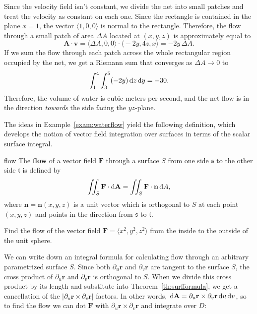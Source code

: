\documentclass[prettycode,shellescape]{watsonbook}
\begin{document}
\begin{solution}
  Since the velocity field isn't constant, we divide the net into
  small patches and treat the velocity as constant on each one. Since
  the rectangle is contained in the plane $x=1$, the vector
  $\langle 1, 0, 0 \rangle$ is normal to the rectangle. Therefore, the flow
  through a small patch of area $\Delta A$ located at $(x,y,z)$ is
  approximately equal to
  \[
    \mathbf{A} \cdot \mathbf{v} = \big\langle \Delta A, 0, 0 \big\rangle \cdot
    \big\langle -2y, 4z, x \big\rangle = -2y \, \Delta A. 
  \]
  If we sum the flow through each patch across the whole rectangular
  region occupied by the net, we get a Riemann sum that converges as
  $\Delta A \to 0$ to
  \[
    \int_1^4 \int_3^5 (-2y) \, \mathrm{d} z \, \mathrm{d} y = -30. 
  \]
  Therefore, the volume of water is  cubic meters per
  second, and the net flow is in the direction \textit{towards} the
  side facing the $yz$-plane.
\end{solution}

The ideas in Example~\ref{exam:waterflow} yield the following
definition, which develops the notion of vector field integration over
surfaces in terms of the scalar surface
integral. 

\begin{defn}{}{flow}
  The \textbf{flow} of a vector field $\mathbf{F}$ through a surface
  $S$ from one side $\mathfrak{s}$ to the other side $\mathfrak{t}$ is defined by
  \[
    \iint_S \mathbf{F} \cdot \mathrm{d}\mathbf{A} =  \iint_S \mathbf{F} \cdot \mathbf{n}
    \, {\mathrm{d}}A, 
  \]
  where $\mathbf{n}=\mathbf{n}(x,y,z)$ is a unit vector which is
  orthogonal to $S$ at each point $(x,y,z)$ and points in the
  direction from $\mathfrak{s}$ to $\mathfrak{t}$. 
\end{defn}

\begin{exercise}{}{}
  Find the flow of the vector field $\mathbf{F} = \langle x^2, y^2, z^2 \rangle$
  from the inside to the outside of the unit sphere. 
\end{exercise}

We can write down an integral formula for calculating flow through an
arbitrary parametrized surface $S$. Since both $\partial_u \mathbf{r}$
and $\partial_v \mathbf{r}$ are tangent to the surface $S$, the cross
product of $\partial_u \mathbf{r} $ and $\partial_v \mathbf{r}$ is
orthogonal to $S$. When we divide this cross product by its length and
substitute into Theorem~\ref{th:surfformula}, we get a cancellation of
the $|\partial_u \mathbf{r} \times \partial_v \mathbf{r}|$ factors. In
other words,
$\mathrm{d}\mathbf{A} = \partial_u \mathbf{r} \times \partial_v \mathbf{r} \,
\mathrm{d} u \, \mathrm{d} v$, so to find the flow we can dot $\mathbf{F}$ with
$\partial_u \mathbf{r} \times \partial_v \mathbf{r}$ and integrate
over $D$:
\end{document}
